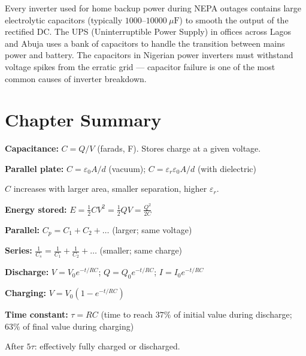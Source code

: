 \begin{realworldbox}
Every inverter used for home backup power during
NEPA outages contains large electrolytic capacitors
(typically $1000$--$10000\ \mu\text{F}$) to smooth
the output of the rectified DC. The UPS (Uninterruptible
Power Supply) in offices across Lagos and Abuja uses
a bank of capacitors to handle the transition between
mains power and battery. The capacitors in Nigerian
power inverters must withstand voltage spikes from
the erratic grid --- capacitor failure is one of the
most common causes of inverter breakdown.
\end{realworldbox}

\section{Chapter Summary}

\begin{summarybox}
\textbf{Capacitance:} $C = Q/V$ (farads, F).
Stores charge at a given voltage.

\textbf{Parallel plate:}
$C = \varepsilon_0 A/d$ (vacuum);
$C = \varepsilon_r\varepsilon_0 A/d$ (with dielectric)

$C$ increases with larger area, smaller separation,
higher $\varepsilon_r$.

\textbf{Energy stored:}
$E = \frac{1}{2}CV^2 = \frac{1}{2}QV = \frac{Q^2}{2C}$

\textbf{Parallel:} $C_p = C_1 + C_2 + \ldots$
(larger; same voltage)

\textbf{Series:}
$\frac{1}{C_s} = \frac{1}{C_1} + \frac{1}{C_2}
+ \ldots$ (smaller; same charge)

\textbf{Discharge:}
$V = V_0 e^{-t/RC}$;
$Q = Q_0 e^{-t/RC}$;
$I = I_0 e^{-t/RC}$

\textbf{Charging:}
$V = V_0(1-e^{-t/RC})$

\textbf{Time constant:} $\tau = RC$
(time to reach $37\%$ of initial value during
discharge; $63\%$ of final value during charging)

After $5\tau$: effectively fully charged or
discharged.
\end{summarybox}


